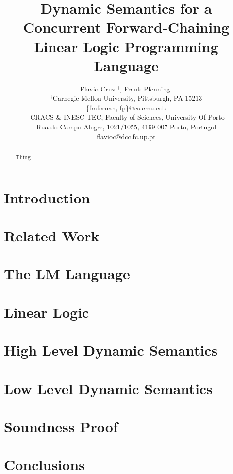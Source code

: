 \documentclass[10pt]{amsart}
\begin{document}
\newcommand{\cmu}{\ensuremath{^\dag}}
\newcommand{\fcup}{\ensuremath{^\ddag}}

\title{Dynamic Semantics for a Concurrent Forward-Chaining Linear Logic Programming Language}
\author{Flavio Cruz\cmu\fcup, Frank Pfenning\cmu\\
       \cmu Carnegie Mellon University, Pittsburgh, PA 15213\\
       \url{{fmfernan, fp}@cs.cmu.edu} \\
       \fcup CRACS \& INESC TEC, Faculty of Sciences, University Of Porto\\
       Rua do Campo Alegre, 1021/1055, 4169-007 Porto, Portugal\\
       \url{flavioc@dcc.fc.up.pt}}

\newtheorem{lemma}{Lemma}[section]
\newtheorem{theorem}{Theorem}[section]
\newtheorem{definition}{Definition}[section]

\begin{abstract}
Thing
\end{abstract}

\maketitle

\section{Introduction}


\section{Related Work}


\section{The LM Language}


\section{Linear Logic}


\section{High Level Dynamic Semantics}


\section{Low Level Dynamic Semantics}


\section{Soundness Proof}


\section{Conclusions}


\end{document}
